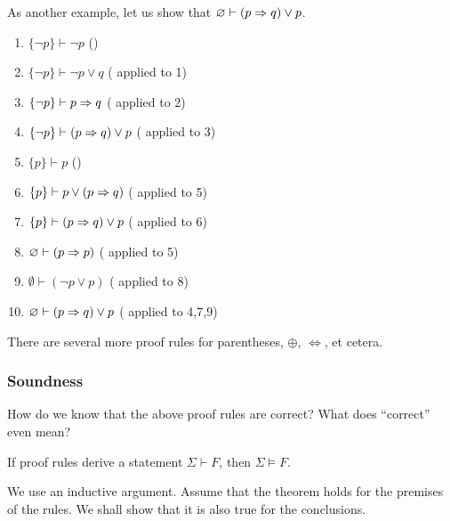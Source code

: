 As another example, let us show that $\varnothing\vdash(p\Rightarrow q)\vee p$.
\begin{enumerate}
	\item $\{\neg p\}\vdash\neg p$ \hfill ()
	\item $\{\neg p\}\vdash \neg p \vee q$ \hfill ( applied to 1)
	\item $\{\neg p\}\vdash p \Rightarrow q$ \hfill ( applied to 2)
	\item $\{\neg p\}\vdash (p \Rightarrow q)\vee p$ \hfill ( applied to 3)

	\item $\{p\}\vdash p$ \hfill ()
	\item $\{p\}\vdash p\vee(p\Rightarrow q)$ \hfill ( applied to 5)
	\item $\{p\}\vdash (p\Rightarrow q)\vee p$ \hfill ( applied to 6)

	\item $\varnothing\vdash (p\Rightarrow p)$ \hfill ( applied to 5)
	\item $\emptyset\vdash (\neg p\vee p)$ \hfill ( applied to 8)
	
	\item $\varnothing\vdash (p\Rightarrow q)\vee p$ \hfill ( applied to 4,7,9)
\end{enumerate}

There are several more proof rules for parentheses, $\oplus$, $\iff$, et cetera.

\subsubsection{Soundness}

How do we know that the above proof rules are correct? What does ``correct'' even mean?

\begin{theorem}
\label{theo: derivation implies modeling}
	If proof rules derive a statement $\Sigma\vdash F$, then $\Sigma\vDash F$.
\end{theorem}
We use an inductive argument. Assume that the theorem holds for the premises of the rules. We shall show that it is also true for the conclusions.\\

